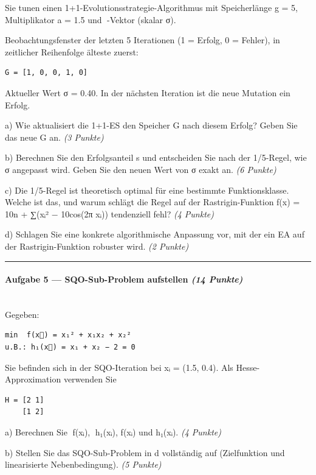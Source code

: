 \documentclass[11pt, a4paper]{article}
\begin{document}
Sie tunen einen 1+1-Evolutionsstrategie-Algorithmus mit Speicherlänge g = 5, Multiplikator a = 1.5 und σ⃗-Vektor (skalar σ).


Beobachtungsfenster der letzten 5 Iterationen (1 = Erfolg, 0 = Fehler), in zeitlicher Reihenfolge älteste zuerst:


\begin{lstlisting}
G = [1, 0, 0, 1, 0]
\end{lstlisting}


Aktueller Wert σ = 0.40. In der nächsten Iteration ist die neue Mutation ein Erfolg.


a) Wie aktualisiert die 1+1-ES den Speicher G nach diesem Erfolg? Geben Sie das neue G an. \textit{(3 Punkte)}


b) Berechnen Sie den Erfolgsanteil s und entscheiden Sie nach der 1/5-Regel, wie σ angepasst wird. Geben Sie den neuen Wert von σ exakt an. \textit{(6 Punkte)}


c) Die 1/5-Regel ist theoretisch optimal für eine bestimmte Funktionsklasse. Welche ist das, und warum schlägt die Regel auf der Rastrigin-Funktion f(x⃗) = 10n + ∑(xᵢ² − 10cos(2π xᵢ)) tendenziell fehl? \textit{(4 Punkte)}


d) Schlagen Sie eine konkrete algorithmische Anpassung vor, mit der ein EA auf der Rastrigin-Funktion robuster wird. \textit{(2 Punkte)}



\noindent\textcolor{rulegray}{\rule{\linewidth}{0.4pt}}


\paragraph{Aufgabe 5 — SQO-Sub-Problem aufstellen \textit{(14 Punkte)}}\mbox{}\\[2pt]

Gegeben:


\begin{lstlisting}
min  f(x⃗) = x₁² + x₁x₂ + x₂²
u.B.: h₁(x⃗) = x₁ + x₂ − 2 = 0
\end{lstlisting}


Sie befinden sich in der SQO-Iteration bei x⃗ᵢ = (1.5, 0.4). Als Hesse-Approximation verwenden Sie


\begin{lstlisting}
H = [2 1]
    [1 2]
\end{lstlisting}


a) Berechnen Sie ∇f(x⃗ᵢ), ∇h₁(x⃗ᵢ), f(x⃗ᵢ) und h₁(x⃗ᵢ). \textit{(4 Punkte)}


b) Stellen Sie das SQO-Sub-Problem in d⃗ vollständig auf (Zielfunktion und linearisierte Nebenbedingung). \textit{(5 Punkte)}
\end{document}
